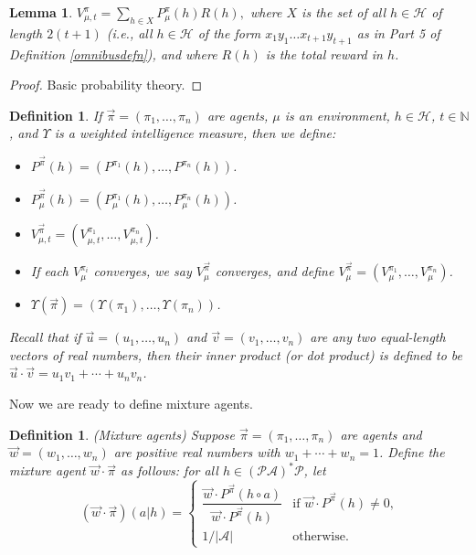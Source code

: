 \documentclass[twoside]{article}
\newtheorem{definition}[theorem]{Definition}
\newtheorem{lemma}[theorem]{Lemma}
\begin{document}
\begin{lemma}
\label{basicprobabilitylemma}
    $V^\pi_{\mu,t}=\sum_{h\in X}P^\pi_\mu(h)R(h),$
    where $X$ is the set of all $h\in\mathcal H$
    of length $2(t+1)$ (i.e., all $h\in\mathcal H$ of the form
    $x_1y_1\ldots x_{t+1}y_{t+1}$
    as in Part 5 of Definition \ref{omnibusdefn}),
    and where $R(h)$ is the total reward in $h$.
\end{lemma}

\begin{proof}
    Basic probability theory.
\end{proof}

\begin{definition}
    If $\vec\pi=(\pi_1,\ldots,\pi_n)$ are agents, $\mu$ is an environment,
    $h\in\mathcal H$, $t\in\mathbb N$, and $\Upsilon$ is a weighted
    intelligence measure, then we define:
    \begin{itemize}
        \item ${P^{\vec\pi}}(h)=(P^{\pi_1}(h),\ldots,P^{\pi_n}(h))$.
        \item $P^{\vec\pi}_\mu(h)=(P^{\pi_1}_\mu(h),\ldots,P^{\pi_n}_\mu(h))$.
        \item $V^{\vec\pi}_{\mu,t}=(V^{\pi_1}_{\mu,t},\ldots,V^{\pi_n}_{\mu,t})$.
        \item If each $V^{\pi_i}_\mu$ converges, we say $V^{\vec\pi}_\mu$
            converges, and define $V^{\vec\pi}_\mu=(V^{\pi_1}_\mu,\ldots,V^{\pi_n}_\mu)$.
        \item $\Upsilon(\vec\pi)=(\Upsilon(\pi_1),\ldots,\Upsilon(\pi_n))$.
    \end{itemize}
    Recall that if $\vec u=(u_1,\ldots,u_n)$ and
    $\vec v=(v_1,\ldots,v_n)$ are any two equal-length
    vectors of real numbers, then their \emph{inner product}
    (or \emph{dot product}) is defined to be
    $\vec u\cdot \vec v=u_1v_1+\cdots+u_nv_n$.
\end{definition}

Now we are ready to define mixture agents.

\begin{definition}
\label{maindefn}
    (Mixture agents)
    Suppose $\vec\pi=(\pi_1,\ldots,\pi_n)$ are agents and $\vec w=(w_1,\ldots,w_n)$
    are positive real numbers with $w_1+\cdots+w_n=1$.
    Define the \emph{mixture agent} $\vec w\cdot\vec\pi$ as follows: for all
    $h\in (\mathcal P\mathcal A)^*\mathcal P$, let
    \[
        (\vec w\cdot\vec\pi)(a|h)
        =
        \begin{cases}
            \dfrac{\vec w\cdot {P^{\vec\pi}}(h\circ a)}{\vec w\cdot {P^{\vec\pi}}(h)}
            &\mbox{if $\vec w\cdot {P^{\vec\pi}}(h)\not=0$,}\\
            1/|\mathcal{A}| &\mbox{otherwise.}
        \end{cases}
    \]
\end{definition}
\end{document}
